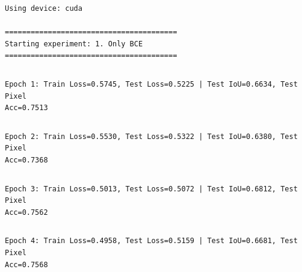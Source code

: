 \documentclass[11pt]{article}
\begin{document}
    \begin{Verbatim}[commandchars=\\\{\}]
Using device: cuda

========================================
Starting experiment: 1. Only BCE
========================================
    \end{Verbatim}

    \begin{Verbatim}[commandchars=\\\{\}]

    \end{Verbatim}

    \begin{Verbatim}[commandchars=\\\{\}]
Epoch 1: Train Loss=0.5745, Test Loss=0.5225 | Test IoU=0.6634, Test Pixel
Acc=0.7513
    \end{Verbatim}

    \begin{Verbatim}[commandchars=\\\{\}]

    \end{Verbatim}

    \begin{Verbatim}[commandchars=\\\{\}]
Epoch 2: Train Loss=0.5530, Test Loss=0.5322 | Test IoU=0.6380, Test Pixel
Acc=0.7368
    \end{Verbatim}

    \begin{Verbatim}[commandchars=\\\{\}]

    \end{Verbatim}

    \begin{Verbatim}[commandchars=\\\{\}]
Epoch 3: Train Loss=0.5013, Test Loss=0.5072 | Test IoU=0.6812, Test Pixel
Acc=0.7562
    \end{Verbatim}

    \begin{Verbatim}[commandchars=\\\{\}]

    \end{Verbatim}

    \begin{Verbatim}[commandchars=\\\{\}]
Epoch 4: Train Loss=0.4958, Test Loss=0.5159 | Test IoU=0.6681, Test Pixel
Acc=0.7568
    \end{Verbatim}
\end{document}
